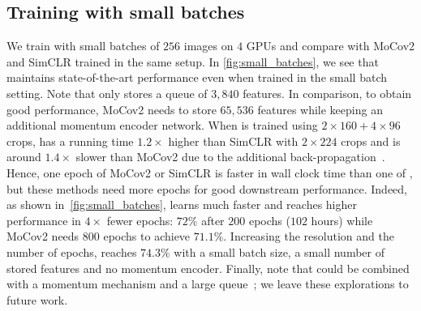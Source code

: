 \subsection{Training with small batches}
We train \OURS with small batches of $256$ images on $4$ GPUs and compare with MoCov2 and SimCLR trained in the same setup.
In \cref{fig:small_batches}, we see that \OURS maintains state-of-the-art performance even when trained in the small batch setting.
Note that \OURS only stores a queue of $3,840$ features.
In comparison, to obtain good performance, MoCov2 needs to store $65,536$ features while keeping an additional momentum encoder network.
When \OURS is trained using $2\!\times\!160+4\!\times\!96$ crops, \OURS has a running time $1.2\times$ higher than SimCLR with $2\!\times\!224$ crops and is around $1.4\times$ slower than MoCov2 due to the additional back-propagation~\cite{chen2020improved}.
Hence, one epoch of MoCov2 or SimCLR is faster in wall clock time than one of \OURS, but these methods need more epochs for good downstream performance.
Indeed, as shown in~\cref{fig:small_batches}, \OURS learns much faster and reaches higher performance in $4\times$ fewer epochs: $72\%$ after $200$ epochs ($102$ hours) while MoCov2 needs $800$ epochs to achieve $71.1\%$.
Increasing the resolution and the number of epochs, \OURS reaches $74.3\%$ with a small batch size, a small number of stored features and no momentum encoder.
Finally, note that \OURS could be combined with a momentum mechanism and a large queue~\cite{he2019momentum}; we leave these explorations to future work.\\

